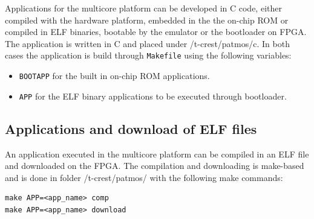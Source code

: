\documentclass[a4paper,fontsize=10pt,twoside,DIV15,BCOR12mm,headinclude=true,footinclude=false,pagesize,bibtotoc]{scrbook}
\newcommand{\code}[1]{{\texttt{#1}}}
\begin{document}
Applications for the multicore platform can be developed in C code, either 
compiled with the hardware platform, embedded in the the on-chip ROM
or compiled in ELF binaries, bootable by the emulator or the bootloader on FPGA.
The application is written in C and placed under /t-crest/patmos/c.
In both cases the application is build through \code{Makefile}
using the following variables:

\begin{itemize}
\item \code{BOOTAPP} for the built in on-chip ROM applications.
\item \code{APP} for the ELF binary applications to be executed through bootloader.
\end{itemize}

%

\subsection{Applications and download of ELF files}

An application executed in the multicore platform can be compiled in an ELF file and downloaded on the FPGA.
The compilation and downloading
is make-based and is done in folder /t-crest/patmos/ with the following make commands:

\begin{verbatim}
make APP=<app_name> comp
make APP=<app_name> download
\end{verbatim}
\end{document}

